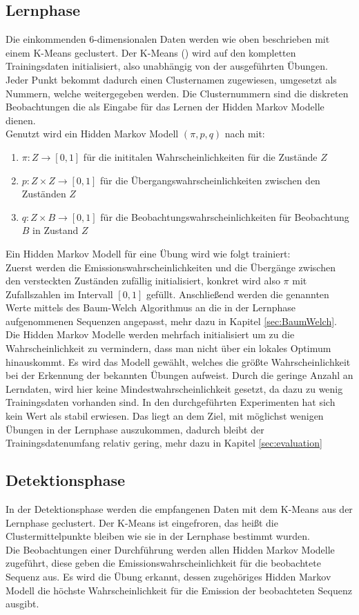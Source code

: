 \documentclass{article}
\begin{document}
\subsection{Lernphase}
Die einkommenden 6-dimensionalen Daten werden wie oben beschrieben mit einem K-Means geclustert.
Der K-Means (\cite{SklearnClusterKMeans2021}) wird auf den kompletten Trainingsdaten initialisiert, also unabhängig von der ausgeführten Übungen.
Jeder Punkt bekommt dadurch einen Clusternamen zugewiesen, umgesetzt als Nummern, welche weitergegeben werden.
Die Clusternummern sind die diskreten Beobachtungen die als Eingabe für das Lernen der Hidden Markov Modelle dienen.\\
Genutzt wird ein Hidden Markov Modell $(\pi, p, q)$ nach \cite{rabinerTutorialHiddenMarkov2001} mit:
\begin{enumerate}
\item $\pi: Z \rightarrow [0,1]$ für die inititalen Wahrscheinlichkeiten für die Zustände $Z$
\item $p: Z \times Z \rightarrow [0,1]$ für die Übergangswahrscheinlichkeiten zwischen den Zuständen $Z$
\item $q: Z \times B \rightarrow [0,1]$ für die Beobachtungswahrscheinlichkeiten für Beobachtung $B$ in Zustand $Z$
\end{enumerate}
Ein Hidden Markov Modell für eine Übung wird wie folgt trainiert:\\
Zuerst werden die Emissionswahrscheinlichkeiten und die Übergänge zwischen den versteckten Zuständen zufällig initialisiert, konkret wird also $\pi$ mit Zufallszahlen im Intervall $[0,1]$ gefüllt.
Anschließend werden die genannten Werte mittels des Baum-Welch Algorithmus an die in der Lernphase aufgenommenen Sequenzen angepasst, mehr dazu in Kapitel \ref{sec:BaumWelch}.
Die Hidden Markov Modelle werden mehrfach initialisiert um zu die Wahrscheinlichkeit zu vermindern, dass man nicht über ein lokales Optimum hinauskommt.
Es wird das Modell gewählt, welches die größte Wahrscheinlichkeit bei der Erkennung der bekannten Übungen aufweist.
Durch die geringe Anzahl an Lerndaten, wird hier keine Mindestwahrscheinlichkeit gesetzt, da dazu zu wenig Trainingsdaten vorhanden sind.
In den durchgeführten Experimenten hat sich kein Wert als stabil erwiesen.
Das liegt an dem Ziel, mit möglichst wenigen Übungen in der Lernphase auszukommen, dadurch bleibt der Trainingsdatenumfang relativ gering, mehr dazu in Kapitel \ref{sec:evaluation}

\subsection{Detektionsphase}
In der Detektionsphase werden die empfangenen Daten mit dem K-Means aus der Lernphase geclustert.
Der K-Means ist eingefroren, das heißt die Clustermittelpunkte bleiben wie sie in der Lernphase bestimmt wurden.\\
Die Beobachtungen einer Durchführung werden allen Hidden Markov Modelle zugeführt, diese geben die Emissionswahrscheinlichkeit für die beobachtete Sequenz aus.
Es wird die Übung erkannt, dessen zugehöriges Hidden Markov Modell die höchste Wahrscheinlichkeit für die Emission der beobachteten Sequenz ausgibt.
\end{document}
